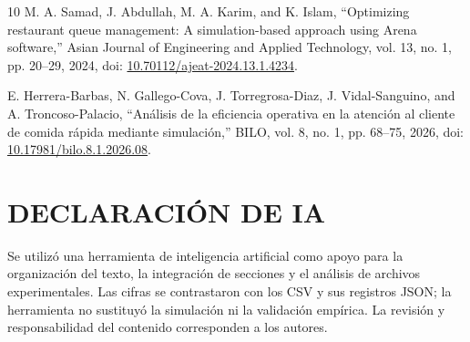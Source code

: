 \documentclass[10pt,a4paper,twocolumn]{article}
\begin{document}
\begin{thebibliography}{10}
 M. A. Samad, J. Abdullah, M. A. Karim, and K. Islam, “Optimizing restaurant queue management: A simulation-based approach using Arena software,” Asian Journal of Engineering and Applied Technology, vol. 13, no. 1, pp. 20–29, 2024, doi: \href{https://doi.org/10.70112/ajeat-2024.13.1.4234}{10.70112/ajeat-2024.13.1.4234}.

 E. Herrera-Barbas, N. Gallego-Cova, J. Torregrosa-Diaz, J. Vidal-Sanguino, and A. Troncoso-Palacio, “Análisis de la eficiencia operativa en la atención al cliente de comida rápida mediante simulación,” BILO, vol. 8, no. 1, pp. 68–75, 2026, doi: \href{https://doi.org/10.17981/bilo.8.1.2026.08}{10.17981/bilo.8.1.2026.08}.

\end{thebibliography}
\section{DECLARACIÓN DE IA}

Se utilizó una herramienta de inteligencia artificial como apoyo para la organización del texto, la integración de secciones y el análisis de archivos experimentales. Las cifras se contrastaron con los CSV y sus registros JSON; la herramienta no sustituyó la simulación ni la validación empírica. La revisión y responsabilidad del contenido corresponden a los autores.
\end{document}
